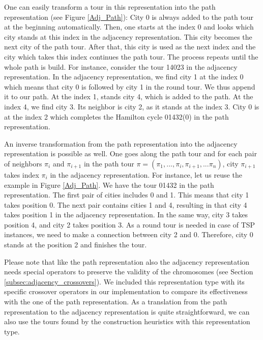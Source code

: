 One can easily transform a tour in this representation into the path representation (see Figure \ref{Adj_Path}): City 0 is always added to the path tour at the beginning automatically. Then, one starts at the index 0 and looks which city stands at this index in the adjacency representation. This city becomes the next city of the path tour. After that, this city is used as the next index and the city which takes this index continues the path tour. The process repeats until the whole path is build. For instance, consider the tour 14023 in the adjacency representation. In the adjacency representation, we find city 1 at the index 0 which means that city 0 is followed by city 1 in the round tour. We thus append it to our path. At the index 1, stands city 4, which is added to the path. At the index 4, we find city 3. Its neighbor is city 2, as it stands at the index 3. City 0 is at the index 2 which completes the Hamilton cycle 01432(0) in the path representation.\par 

 An inverse transformation from the path representation into the adjacency representation is possible as well. One goes along the path tour and for each pair of neighbors $\pi_{i}$ and $\pi_{i + 1}$ in the path tour $\pi = (\pi_{1},...,\pi_{i},\pi_{i + 1},...\pi_{n})$, city $\pi_{i + 1}$ takes index $\pi_{i}$ in the adjacency representation. For instance, let us reuse the example in Figure \ref{Adj_Path}. We have the tour 01432 in the path representation. The first pair of cities includes 0 and 1. This means that city 1 takes position 0. The next pair contains cities 1 and 4, resulting in that city 4 takes position 1 in the adjacency representation. In the same way, city 3 takes position 4, and city 2 takes position 3. As a round tour is needed in case of TSP instances, we need to make a connection between city 2 and 0. Therefore, city 0 stands at the position 2 and finishes the tour.\par 

Please note that like the path representation also the adjacency representation needs special operators to preserve the validity of the chromosomes (see Section \ref{subsec:adjacency_crossovers}). We included this representation type with its specific crossover operators in our implementation to compare its effectiveness with the one of the path representation. As a translation from the path representation to the adjacency representation is quite straightforward, we can also use the tours found by the construction heuristics with this representation type.\par 